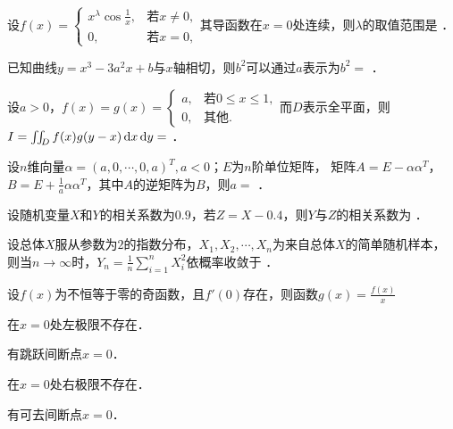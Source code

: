 \documentclass[plain,noanswer,medmath]{../../template/jnuexam}
\begin{document}




\begin{problem}
设$f(x) = \begin{cases}
  x^{\lambda}\cos \frac{1}{x}, & \text{若$x \ne 0$}, \\
                            0, & \text{若$x = 0$},
\end{cases}$其导函数在$x = 0$处连续，则$\lambda$的取值范围是 \fillin{}．
\end{problem}


\begin{problem}
已知曲线$y = x^3 - 3a^2 x + b$与$x$轴相切，则$b^2$可以通过$a$表示为$b^2 =$ \fillin{}．
\end{problem}


\begin{problem}
设$a > 0$，$f(x) = g(x) = \begin{cases}
  a, & \text{若$0 \le x \le 1$}, \\
  0, & \text{其他}.
\end{cases}$而$D$表示全平面，则\goodbreak$I = \iint_D f(x)g(y - x)\mathop{}\!\mathrm{d} x\mathop{}\!\mathrm{d} y =$ \fillin{}．
\end{problem}


\begin{problem}
设$n$维向量$\alpha = (a,0, \cdots ,0,a)^T,a < 0$；$E$为$n$阶单位矩阵，
矩阵$A = E - \alpha \alpha^T$，$B = E + \frac{1}{a}\alpha \alpha^T$，其中$A$的逆矩阵为$B$，则$a =$ \fillin{}．
\end{problem}


\begin{problem}
设随机变量$X$和$Y$的相关系数为$0.9$，若$Z = X - 0.4$，则$Y$与$Z$的相关系数为 \fillin{}．
\end{problem}


\begin{problem}
设总体$X$服从参数为$2$的指数分布，$X_1,X_2, \cdots ,X_n$为来自总体$X$的简单随机样本，
则当$n \to \infty$时，$Y_n = \frac{1}{n}\sum_{i = 1}^n X_i^2$依概率收敛于 \fillin{}．
\end{problem}




\begin{problem}
设$f(x)$为不恒等于零的奇函数，且$f'(0)$存在，则函数$g(x) = \frac{f(x)}{x}$\pickout{}
\begin{abcd}
\item 在$x = 0$处左极限不存在．
\item 有跳跃间断点$x = 0$．
\item 在$x = 0$处右极限不存在．
\item 有可去间断点$x = 0$．
\end{abcd}
\end{problem}
\end{document}
